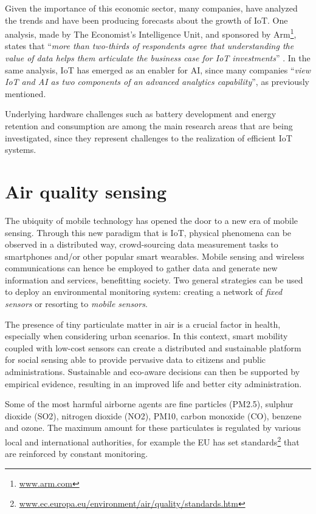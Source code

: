 			Given the importance of this economic sector, many companies, have analyzed the trends and have been producing forecasts about the growth of IoT.
			One analysis, made by The Economist's Intelligence Unit, and sponsored by Arm\footnote{ \url{www.arm.com}}, states that ``\textit{more than two-thirds of respondents agree that understanding the value of data helps them articulate the business case for IoT investments}'' \cite{economist-iot-business-index-2020-arm}.
			In the same analysis, IoT has emerged as an enabler for AI, since many companies ``\textit{view IoT and AI as two components of an advanced analytics capability}'', as previously mentioned.
	
			Underlying hardware challenges such as battery development and energy retention and consumption are among the main research areas that are being investigated, since they represent challenges to the realization of efficient IoT systems.
				
	\section{Air quality sensing}
	
		The ubiquity of mobile technology has opened the door to a new era of mobile sensing. 
		Through this new paradigm that is IoT, physical phenomena can be observed in a distributed way, crowd-sourcing data measurement tasks to smartphones and/or other popular smart wearables.
		Mobile sensing and wireless communications can hence be employed to gather data and generate new information and services, benefitting society.
		Two general strategies can be used to deploy an environmental monitoring system: creating a network of \textit{fixed sensors}	or resorting to \textit{mobile sensors}.
			
		The presence of tiny particulate matter in air is a crucial factor in health, especially when considering urban scenarios.
		In this context, smart mobility coupled with low-cost sensors can create a distributed and sustainable platform for social sensing able to provide pervasive data to citizens and public administrations. 
		Sustainable and eco-aware decisions can then be supported by empirical evidence, resulting in an improved life and better city administration.
		
		Some of the most harmful airborne agents are fine particles (PM2.5), sulphur dioxide (SO2), nitrogen dioxide (NO2), PM10, carbon monoxide (CO), benzene and ozone.
		The maximum amount for these particulates is regulated by various local and international authorities, for example the EU has set standards\footnote{ \url{www.ec.europa.eu/environment/air/quality/standards.htm}} that are reinforced by constant monitoring.
				
